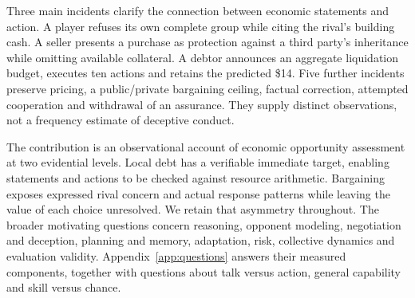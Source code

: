 Three main incidents clarify the connection between economic statements and action. A player refuses its own complete group while citing the rival's building cash. A seller presents a purchase as protection against a third party's inheritance while omitting available collateral. A debtor announces an aggregate liquidation budget, executes ten actions and retains the predicted \$14. Five further incidents preserve pricing, a public/private bargaining ceiling, factual correction, attempted cooperation and withdrawal of an assurance. They supply distinct observations, not a frequency estimate of deceptive conduct.

The contribution is an observational account of economic opportunity assessment at two evidential levels. Local debt has a verifiable immediate target, enabling statements and actions to be checked against resource arithmetic. Bargaining exposes expressed rival concern and actual response patterns while leaving the value of each choice unresolved. We retain that asymmetry throughout. The broader motivating questions concern reasoning, opponent modeling, negotiation and deception, planning and memory, adaptation, risk, collective dynamics and evaluation validity. Appendix~\ref{app:questions} answers their measured components, together with questions about talk versus action, general capability and skill versus chance.

